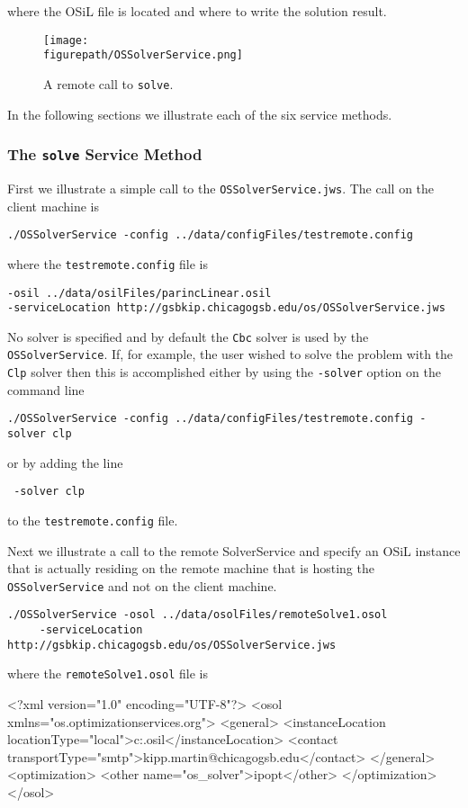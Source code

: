 \documentclass[11pt]{article}
\newcommand{\figurepath}{./figures}
\renewcommand{\_}{{\char"5F}}
\renewcommand{\{}{{\char"7B}}
\renewcommand{\}}{{\char"7D}}
\renewcommand{\^}{{\char"0D}}
\renewcommand{\'}{{\char"0D}}
\begin{document}
  where the OSiL file is located and where to write the solution result.

\begin{figure}
\centering
\texttt{[image: \\figurepath/OSSolverService.png]}
\caption{A remote call to {\tt solve}.}
\label{figure:ossolverservice}
\end{figure}


In the following sections we illustrate each of the six service methods.

\subsubsection{The  {\tt solve} Service Method}\label{section:solve}

First we illustrate a simple call to  the  {\tt OSSolverService.jws}.  The call on the client machine is

\begin{verbatim}
./OSSolverService -config ../data/configFiles/testremote.config
\end{verbatim}
where the {\tt testremote.config} file is
\begin{verbatim}
-osil ../data/osilFiles/parincLinear.osil
-serviceLocation http://gsbkip.chicagogsb.edu/os/OSSolverService.jws
\end{verbatim}

No solver is specified and by default the  {\tt Cbc} solver  is used by the {\tt OSSolverService}.   If, for example, the user wished to solve the problem with the {\tt Clp} solver then this is accomplished either by using the  {\tt -solver} option on the command line
\begin{verbatim}
./OSSolverService -config ../data/configFiles/testremote.config -solver clp
\end{verbatim}
or by  adding  the line
\begin{verbatim}
 -solver clp
\end{verbatim}
to the  {\tt testremote.config} file.

Next we illustrate a call to the remote SolverService and specify an OSiL instance that is actually residing on the remote machine that is hosting the {\tt OSSolverService} and not on the client machine.
\begin{verbatim}
./OSSolverService -osol ../data/osolFiles/remoteSolve1.osol
     -serviceLocation  http://gsbkip.chicagogsb.edu/os/OSSolverService.jws
\end{verbatim}
where the {\tt remoteSolve1.osol} file is
\begin{verbatimtab}[4]
<?xml version="1.0" encoding="UTF-8"?>
<osol xmlns="os.optimizationservices.org">
    <general>
         <instanceLocation locationType="local">c:\parincLinear.osil</instanceLocation>
         <contact transportType="smtp">kipp.martin@chicagogsb.edu</contact>
    </general>
    <optimization>
    	<other name="os_solver">ipopt</other>
    </optimization>
</osol>
\end{verbatimtab}
\end{document}
